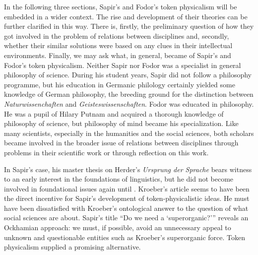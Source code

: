 \documentclass[output=paper]{langscibook}
\begin{document}
In the following three sections, Sapir's and Fodor's token physicalism will be embedded in a wider context. The rise and development of their theories can be further clarified in this way. There is, firstly, the preliminary question of how they got involved in the problem of relations between disciplines and, secondly, whether their similar solutions were based on any clues in their intellectual environments. Finally, we may ask what, in general, became of Sapir's and Fodor's token physicalism. Neither Sapir nor Fodor was a specialist in general philosophy of science. During his student years, Sapir did not follow a philosophy programme, but his education in Germanic philology certainly yielded some knowledge of German philosophy, the breeding ground for the distinction between \emph{Naturwissenchaften} and \emph{Geisteswissenschaften}. Fodor was educated in philosophy. He was a pupil of Hilary Putnam and acquired a thorough knowledge of philosophy of science, but philosophy of mind became his specialization. Like many scientists, especially in the humanities and the social sciences, both scholars became involved in the broader issue of relations between disciplines through problems in their scientific work or through reflection on this work.

In Sapir's case, his master thesis on Herder's \emph{Ursprung der Sprache} \citep{Sapir1907} bears witness to an early interest in the foundations of linguistics, but he did not become involved in foundational issues again until \citeyear{Sapir1917}. Kroeber's article seems to have been the direct incentive for Sapir's development of token-physicalistic ideas. He must have been dissatisfied with Kroeber's ontological answer to the question of what social sciences are about. Sapir's title ``Do we need a `superorganic?'\thinspace'' reveals an Ockhamian approach: we must, if possible, avoid an unnecessary appeal to unknown and questionable entities such as Kroeber's superorganic force. Token physicalism supplied a promising alternative.
\end{document}

